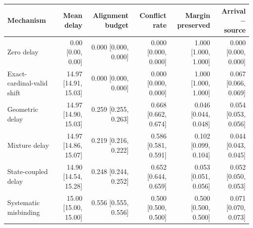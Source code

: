 \begin{tabular}{lrrrrr}
\toprule
Mechanism & Mean delay & Alignment budget & Conflict rate & Margin preserved & Arrival $-$ source \\
\midrule
Zero delay & 0.00 [0.00, 0.00] & 0.000 [0.000, 0.000] & 0.000 [0.000, 0.000] & 1.000 [1.000, 1.000] & 0.000 [0.000, 0.000] \\
Exact-cardinal-valid shift & 14.97 [14.91, 15.03] & 0.000 [0.000, 0.000] & 0.000 [0.000, 0.000] & 1.000 [1.000, 1.000] & 0.067 [0.066, 0.069] \\
Geometric delay & 14.97 [14.90, 15.03] & 0.259 [0.255, 0.263] & 0.668 [0.662, 0.674] & 0.046 [0.044, 0.048] & 0.054 [0.053, 0.056] \\
Mixture delay & 14.97 [14.86, 15.07] & 0.219 [0.216, 0.222] & 0.586 [0.581, 0.591] & 0.102 [0.099, 0.104] & 0.044 [0.043, 0.045] \\
State-coupled delay & 14.90 [14.54, 15.28] & 0.248 [0.244, 0.252] & 0.652 [0.644, 0.659] & 0.053 [0.051, 0.056] & 0.052 [0.050, 0.053] \\
Systematic misbinding & 15.00 [15.00, 15.00] & 0.556 [0.555, 0.556] & 0.500 [0.500, 0.500] & 0.500 [0.500, 0.500] & 0.071 [0.070, 0.073] \\
\bottomrule
\end{tabular}
